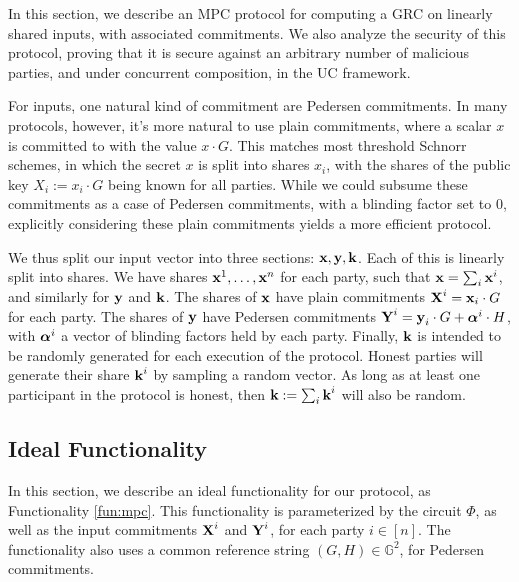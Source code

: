 In this section, we describe an MPC protocol for computing
a GRC on linearly shared inputs, with associated commitments.
We also analyze the security of this protocol, proving that it
is secure against an arbitrary number of malicious parties,
and under concurrent composition, in the UC framework.

For inputs, one natural kind of commitment are Pedersen commitments.
In many protocols, however, it's more natural to use plain commitments,
where a scalar $x$ is committed to with the value $x \cdot G$.
This matches most threshold Schnorr schemes,
in which the secret $x$ is split into shares $x_i$, with the shares
of the public key $X_i := x_i \cdot G$ being known for all parties.
While we could subsume these commitments as a case of Pedersen commitments,
with a blinding factor set to $0$, explicitly considering these
plain commitments yields a more efficient protocol.

We thus split our input vector into three sections: $\textbf{x}, \textbf{y}, \textbf{k}$.
Each of this is linearly split into shares.
We have shares $\textbf{x}^1, \ldots, \textbf{x}^n$ for each party, such that $\textbf{x} = \sum_i \textbf{x}^i$,
and similarly for $\textbf{y}$ and $\textbf{k}$.
The shares of $\textbf{x}$ have plain commitments $\textbf{X}^i = \textbf{x}_i \cdot G$
for each party.
The shares of $\textbf{y}$ have Pedersen commitments $\textbf{Y}^i = \textbf{y}_i \cdot G + \boldsymbol{\alpha}^i \cdot H$,
with $\boldsymbol{\alpha}^i$ a vector of blinding factors held by each party.
Finally, $\textbf{k}$ is intended to be randomly generated for each execution
of the protocol.
Honest parties will generate their share $\textbf{k}^i$ by sampling a random
vector.
As long as at least one participant in the protocol is honest,
then $\textbf{k} := \sum_i \textbf{k}^i$ will also be random.

\subsection{Ideal Functionality}
\label{sec:idealfunc}
In this section, we describe an ideal functionality for our protocol,
as Functionality \ref{fun:mpc}.
This functionality is parameterized by the circuit $\Phi$,
as well as the input commitments $\textbf{X}^i$ and $\textbf{Y}^i$, for each party
$i \in [n]$.
The functionality also uses a common reference string $(G, H) \in \mathbb{G}^2$,
for Pedersen commitments.

